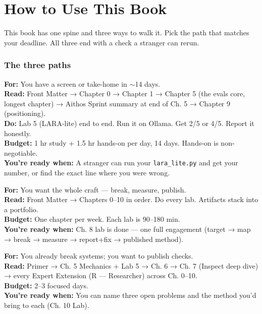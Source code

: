 \newpage

\chapter*{How to Use This Book}

This book has one spine and three ways to walk it. Pick the path that matches your deadline. All three end with a check a stranger can rerun.

\subsection*{The three paths}

\begin{tcolorbox}[colback=lightblue,colframe=defblue,title=Path 1 — The 2-Week Sprint (the Aithos window),fonttitle=\bfseries,sharp corners,boxrule=1pt]
\textbf{For:} You have a screen or take-home in $\sim$14 days.\\
\textbf{Read:} Front Matter → Chapter 0 → Chapter 1 → Chapter 5 (the evals core, longest chapter) → Aithos Sprint summary at end of Ch. 5 → Chapter 9 (positioning).\\
\textbf{Do:} Lab 5 (LARA-lite) end to end. Run it on Ollama. Get 2/5 or 4/5. Report it honestly.\\
\textbf{Budget:} 1 hr study + 1.5 hr hands-on per day, 14 days. Hands-on is non-negotiable.\\
\textbf{You’re ready when:} A stranger can run your \texttt{lara\_lite.py} and get your number, or find the exact line where you were wrong.
\end{tcolorbox}

\begin{tcolorbox}[colback=lightgreen,colframe=labgreen,title=Path 2 — The Full Path (10–12 weeks),fonttitle=\bfseries,sharp corners,boxrule=1pt]
\textbf{For:} You want the whole craft — break, measure, publish.\\
\textbf{Read:} Front Matter → Chapters 0–10 in order. Do every lab. Artifacts stack into a portfolio.\\
\textbf{Budget:} One chapter per week. Each lab is 90–180 min.\\
\textbf{You’re ready when:} Ch. 8 lab is done — one full engagement (target → map → break → measure → report+fix → published method).
\end{tcolorbox}

\begin{tcolorbox}[colback=lightamber,colframe=pitamber,title=Path 3 — The Research Path (expert jump-in),fonttitle=\bfseries,sharp corners,boxrule=1pt]
\textbf{For:} You already break systems; you want to publish checks.\\
\textbf{Read:} Primer → Ch. 5 Mechanics + Lab 5 → Ch. 6 → Ch. 7 (Inspect deep dive) → every Expert Extension (R — Researcher) across Ch. 0–10.\\
\textbf{Budget:} 2–3 focused days.\\
\textbf{You’re ready when:} You can name three open problems and the method you’d bring to each (Ch. 10 Lab).
\end{tcolorbox}

